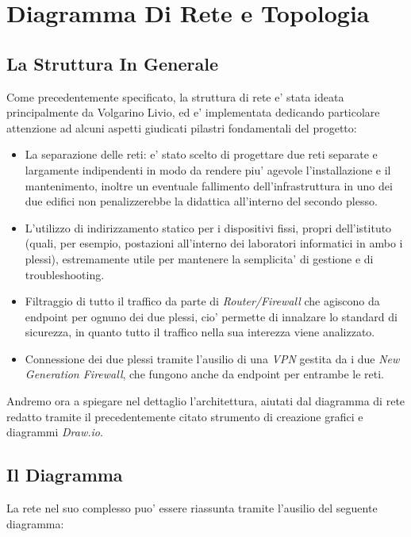 \documentclass{report}
\begin{document}
	\chapter{Diagramma Di Rete e Topologia}
	\begin{sloppypar}
		\author{Volgarino Livio}
		\section{La Struttura In Generale}
			Come precedentemente specificato, la struttura di rete e' stata ideata principalmente da Volgarino Livio, ed e'
			implementata dedicando particolare attenzione ad alcuni aspetti giudicati pilastri fondamentali del progetto:
			\begin{itemize}
				\item La separazione delle reti: e' stato scelto di progettare due reti separate e largamente indipendenti
					in modo da rendere piu' agevole l'installazione e il mantenimento, inoltre un eventuale fallimento
					dell'infrastruttura in uno dei due edifici non penalizzerebbe la didattica all'interno del secondo plesso.
				\item L'utilizzo di indirizzamento statico per i dispositivi fissi, propri dell'istituto (quali, per esempio,
					postazioni all'interno dei laboratori informatici in ambo i plessi), estremamente utile per mantenere
					la semplicita' di gestione e di troubleshooting.
				\item Filtraggio di tutto il traffico da parte di \emph{Router/Firewall} che agiscono da endpoint per ognuno dei due
					plessi, cio' permette di innalzare lo standard di sicurezza, in quanto tutto il traffico nella sua interezza
					viene analizzato.
				\item Connessione dei due plessi tramite l'ausilio di una \emph{VPN} gestita da i due \emph{New Generation
					Firewall}, che fungono anche da endpoint per entrambe le reti.
			\end{itemize}
			Andremo ora a spiegare nel dettaglio l'architettura, aiutati dal diagramma di rete redatto tramite il precedentemente
			citato strumento di creazione grafici e diagrammi \emph{Draw.io}.
		\section{Il Diagramma}
			La rete nel suo complesso puo' essere riassunta tramite l'ausilio del seguente diagramma:


\end{sloppypar}
\end{document}
